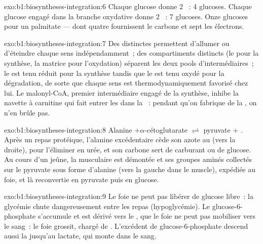 \begin{solution}{exo:b1:biosyntheses-integration:6}
Chaque glucose donne 2 ~: 4 glucoses. Chaque glucose engagé
dans la branche oxydative donne 2 ~: 7 glucoses. Onze glucoses pour
un palmitate --- dont quatre fournissent le carbone et sept les
électrons.
\end{solution}

\begin{solution}{exo:b1:biosyntheses-integration:7}
Des  distinctes permettent d'allumer ou d'éteindre chaque sens
indépendamment~; des compartiments distincts (le  pour la
synthèse, la matrice pour l'oxydation) séparent les deux pools
d'intermédiaires~; le  est tenu réduit pour la synthèse tandis que
le  est tenu oxydé pour la dégradation, de sorte que chaque sens est
thermodynamiquement favorisé chez lui. Le malonyl-CoA, premier
intermédiaire engagé de la synthèse, inhibe la navette à carnitine qui
fait entrer les  dans la ~: pendant qu'on
fabrique de la , on n'en brûle pas.
\end{solution}

\begin{solution}{exo:b1:biosyntheses-integration:8}
Alanine $+ \alpha$-cétoglutarate $\rightleftharpoons$ pyruvate $+$
. Après un repas protéique, l'alanine excédentaire cède son
azote au  (vers la droite), pour l'éliminer en urée, et son
carbone sert de carburant ou de glucose. Au cours d'un jeûne, la
 musculaire est démontée et ses groupes aminés collectés sur le
pyruvate sous forme d'alanine (vers la gauche dans le muscle), expédiée
au foie, et là reconvertie en pyruvate puis en glucose.
\end{solution}

\begin{solution}{exo:b1:biosyntheses-integration:9}
Le foie ne peut pas libérer de glucose libre~: la glycémie chute
dangereusement entre les repas (hypoglycémie). Le glucose-6-phosphate
s'accumule et est dérivé vers le , que le foie ne peut pas
mobiliser vers le sang~: le foie grossit, chargé de .
L'excédent de glucose-6-phosphate descend aussi la  jusqu'au
lactate, qui monte dans le sang.
\end{solution}

